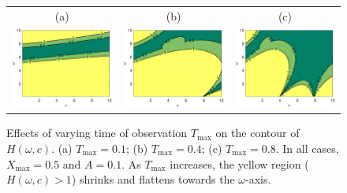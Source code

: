 \documentclass[a4paper,11pt]{article}
\theoremstyle{definition}
\begin{document}
\begin{figure}
\centering
\begin{tabular}{ccc}
(a)&(b)&(c)\\
\includegraphics[width=2in]{Figures/MIPcontour4.eps}&
\includegraphics[width=2in]{Figures/MIPcontour5.eps}&
\includegraphics[width=2in]{Figures/MIPcontour6.eps}
\end{tabular}
\caption{Effects of varying time of observation $T_{\max}$ on the contour of $H(\omega,c)$. (a) $T_{\max}=0.1$; (b) $T_{\max}=0.4$; (c) $T_{\max}=0.8$.  In all cases, $X_{\max}=0.5$ and $A=0.1$. As $T_{\max}$ increases, the yellow region ($H(\omega,c)>1$) shrinks and flattens towards the $\omega$-axis.}\label{fig.MIPtest2}
\end{figure}
\end{document}
